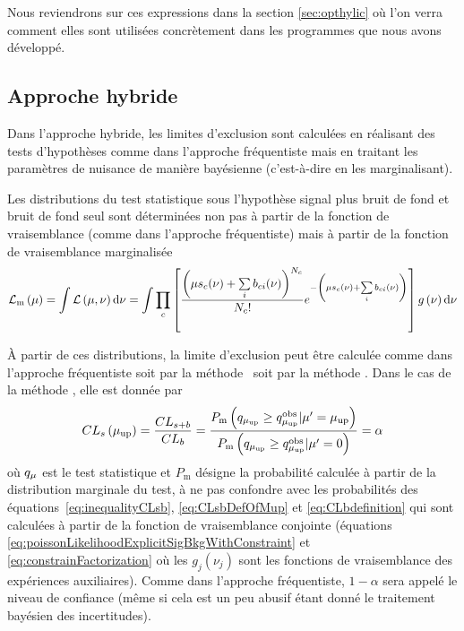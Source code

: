 Nous reviendrons sur ces expressions dans la section \ref{sec:opthylic} o\`u l'on verra comment elles sont utilis\'ees concr\`etement dans les programmes que nous avons d\'evelopp\'e.

\subsection{Approche hybride}
\label{sec:hybridApproach}

Dans l'approche hybride, les limites d'exclusion sont calcul\'ees en r\'ealisant des tests d'hypoth\`eses comme dans l'approche fr\'equentiste mais en traitant les param\`etres de nuisance de mani\`ere bay\'esienne (c'est-\`a-dire en les marginalisant). 

Les distributions du test statistique sous l'hypoth\`ese signal plus bruit de fond et bruit de fond seul sont d\'etermin\'ees non pas \`a partir de la fonction de vraisemblance (comme dans l'approche fr\'equentiste) mais \`a partir de la fonction de vraisemblance marginalis\'ee
\begin{equation}
\label{eq:marginalLhood}
{\cal L}_\text{m}\left(\mu\right)=\displaystyle\int{\cal L}\left(\mu,\nu\right){\rm d}\nu=\displaystyle\int\prod\limits_c\left[\frac{\left(\mu s_c(\nu)+\sum\limits_i b_{ci}(\nu)\right)^{N_{c}}}{N_{c}!}e^{-\left(\mu s_c(\nu)+\sum\limits_i b_{ci}(\nu)\right)}\right]g\left(\nu\right){\rm d}\nu
\end{equation}

\`A partir de ces distributions, la limite d'exclusion peut \^etre calcul\'ee comme dans l'approche fr\'equentiste soit par la m\'ethode \CLsb~soit par la m\'ethode \CLs. Dans le cas de la m\'ethode \CLs, elle est donn\'ee par
\begin{equation}
\label{eq:hybrideCLSLimitDef}
CL_s\left(\mu_{\text{up}}\right)=\frac{CL_{s+b}}{CL_b}=\frac{P_\text{m}\left(q_{\mu_\text{up}}\geq q_{\mu_\text{up}}^{\text{obs}}|\mu'=\mu_{\text{up}}\right)}{P_\text{m}\left(q_{\mu_\text{up}}\geq q_{\mu_\text{up}}^{\text{obs}}|\mu'=0\right)}=\alpha
\end{equation}
o\`u $q_\mu$ est le test statistique et $P_\text{m}$ d\'esigne la probabilit\'e calcul\'ee \`a partir de la distribution marginale du test, \`a ne pas confondre avec les probabilit\'es des \'equations~\ref{eq:inequalityCLsb}, \ref{eq:CLsbDefOfMup} et \ref{eq:CLbdefinition} qui sont calcul\'ees \`a partir de la fonction de vraisemblance conjointe (\'equations \ref{eq:poissonLikelihoodExplicitSigBkgWithConstraint} et \ref{eq:constrainFactorization} o\`u les $g_j\left(\nu_j\right)$ sont les fonctions de vraisemblance des exp\'eriences auxiliaires). Comme dans l'approche fr\'equentiste, $1-\alpha$ sera appel\'e le niveau de confiance (m\^eme si cela est un peu abusif \'etant donn\'e le traitement bay\'esien des incertitudes).


